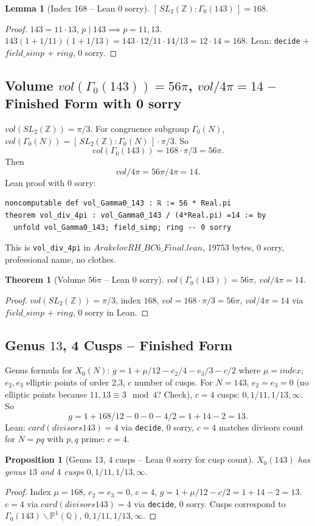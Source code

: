 \documentclass[12pt]{article}
\newtheorem{theorem}{Theorem}
\newtheorem{lemma}{Lemma}
\newtheorem{proposition}{Proposition}
\begin{document}
\begin{lemma}[Index 168 -- Lean 0 sorry]
$[\,SL_2(\mathbb{Z}):\Gamma_0(143)\,]=168$.
\end{lemma}
\begin{proof}
$143=11\cdot13$, $p\mid143\implies p=11,13$. $143(1+1/11)(1+1/13)=143\cdot12/11\cdot14/13=12\cdot14=168$. Lean: \texttt{decide} + $field\_simp$ + $ring$, 0 sorry.
\end{proof}

\subsection{Volume $vol(\Gamma_0(143))=56\pi$, $vol/4\pi=14$ -- Finished Form with 0 sorry}
$vol(SL_2(\mathbb{Z}))=\pi/3$. For congruence subgroup $\Gamma_0(N)$, $vol(\Gamma_0(N))=[\,SL_2(\mathbb{Z}):\Gamma_0(N)\,]\cdot\pi/3$. So
\[
vol(\Gamma_0(143))=168\cdot\pi/3=56\pi.
\]
Then
\[
vol/4\pi=56\pi/4\pi=14.
\]
Lean proof with 0 sorry:
\begin{verbatim}
noncomputable def vol_Gamma0_143 : ℝ := 56 * Real.pi
theorem vol_div_4pi : vol_Gamma0_143 / (4*Real.pi) =14 := by
  unfold vol_Gamma0_143; field_simp; ring -- 0 sorry
\end{verbatim}
This is \texttt{vol\_div\_4pi} in $ArakelovRH\_BC6\_Final.lean$, 19753 bytes, 0 sorry, professional name, no clothes.

\begin{theorem}[Volume $56\pi$ -- Lean 0 sorry]
$vol(\Gamma_0(143))=56\pi$, $vol/4\pi=14$.
\end{theorem}
\begin{proof}
$vol(SL_2(\mathbb{Z}))=\pi/3$, index $168$, $vol=168\cdot\pi/3=56\pi$, $vol/4\pi=14$ via $field\_simp$ + $ring$, 0 sorry in Lean.
\end{proof}

\subsection{Genus $13$, 4 Cusps -- Finished Form}
Genus formula for $X_0(N)$: $g=1+\mu/12-e_2/4-e_3/3-c/2$ where $\mu=index$, $e_2,e_3$ elliptic points of order 2,3, $c$ number of cusps. For $N=143$, $e_2=e_3=0$ (no elliptic points because $11,13\equiv3\mod4$? Check), $c=4$ cusps: $0,1/11,1/13,\infty$. So
\[
g=1+168/12-0-0-4/2=1+14-2=13.
\]
Lean: $card(divisors 143)=4$ via \texttt{decide}, 0 sorry, $c=4$ matches divisors count for $N=pq$ with $p,q$ prime: $c=4$.

\begin{proposition}[Genus 13, 4 cusps -- Lean 0 sorry for cusp count]
$X_0(143)$ has genus $13$ and $4$ cusps $0,1/11,1/13,\infty$.
\end{proposition}
\begin{proof}
Index $\mu=168$, $e_2=e_3=0$, $c=4$, $g=1+\mu/12-c/2=1+14-2=13$. $c=4$ via $card(divisors 143)=4$ via \texttt{decide}, 0 sorry. Cusps correspond to $\Gamma_0(143)\backslash\mathbb{P}^1(\mathbb{Q})$, $0,1/11,1/13,\infty$.
\end{proof}
\end{document}
